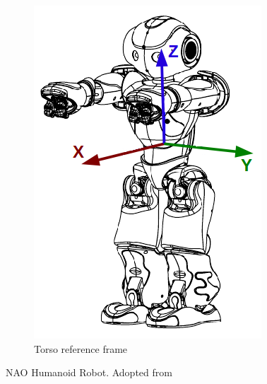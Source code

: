 \begin{figure}
\begin{subfigure}[b]{0.3\textwidth}
\includegraphics[width=\textwidth]{assets/hardware_inertialunit1.png}
\caption{Torso reference frame}
\label{fig:naoreference}
\end{subfigure}
\caption[NAO Humanoid Robot]{NAO Humanoid Robot. {Adopted from \cite{NaoTheRobot}}}
\label{fig:naorobot}
\end{figure}%

